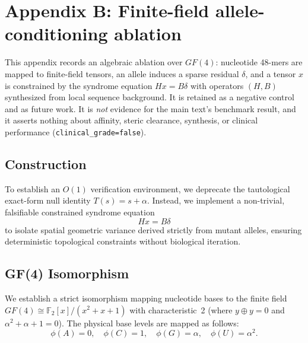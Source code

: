%

\section{Appendix B: Finite-field allele-conditioning ablation}
\label{app:gf4}

This appendix records an algebraic ablation over \(GF(4)\): nucleotide 48-mers
are mapped to finite-field tensors, an allele induces a sparse residual
\(\delta\), and a tensor \(x\) is constrained by the syndrome equation
\(Hx=B\delta\) with operators \((H,B)\) synthesized from local sequence
background. It is retained as a negative control and as future work. It is
\emph{not} evidence for the main text's benchmark result, and it asserts
nothing about affinity, steric clearance, synthesis, or clinical performance
(\texttt{clinical\_grade=false}).

\subsection{Construction}
To establish an \(O(1)\) verification environment, we deprecate the
tautological exact-form null identity
\(T(s)=s+\alpha\). Instead, we implement a non-trivial, falsifiable constrained
syndrome equation
\begin{equation}
  Hx = B\delta
\end{equation}
to isolate spatial geometric variance derived strictly from mutant alleles,
ensuring deterministic topological constraints without biological iteration.

\subsection{GF(4) Isomorphism}
We establish a strict isomorphism mapping nucleotide bases to the finite field
\(GF(4)\cong\mathbb{F}_2[x]/(x^2+x+1)\) with characteristic~2
(where \(y\oplus y=0\) and \(\alpha^2+\alpha+1=0\)). The physical base levels
are mapped as follows:
\begin{equation}
\phi(A)=0,\quad \phi(C)=1,\quad \phi(G)=\alpha,\quad \phi(U)=\alpha^2.
\end{equation}

